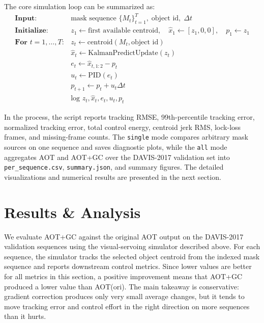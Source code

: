 \documentclass{article}
\begin{document}
The core simulation loop can be summarized as:
\[
\begin{array}{ll}
\textbf{Input:} & \text{mask sequence } \{M_t\}_{t=1}^{T},\; \text{object id},\; \Delta t \\
\textbf{Initialize:} & z_1 \leftarrow \text{first available centroid},\quad
                     \hat{x}_1 \leftarrow [z_1,0,0],\quad p_1 \leftarrow z_1 \\
\textbf{For } t=1,\ldots,T: &
  z_t \leftarrow \text{centroid}(M_t,\text{object id}) \\
& \hat{x}_t \leftarrow \text{KalmanPredictUpdate}(z_t) \\
& e_t \leftarrow \hat{x}_{t,1:2}-p_t \\
& u_t \leftarrow \text{PID}(e_t) \\
& p_{t+1} \leftarrow p_t + u_t\Delta t \\
& \text{log } z_t,\hat{x}_t,e_t,u_t,p_t
\end{array}
\]

In the process, the script reports tracking RMSE, 99th-percentile tracking error, normalized 
tracking error, total control energy, centroid jerk RMS, lock-loss frames, 
and missing-frame counts. The \texttt{single} mode compares arbitrary mask sources on one sequence and 
saves diagnostic plots, while the \texttt{all} mode aggregates AOT and AOT+GC over the DAVIS-2017 
validation set into \texttt{per\_sequence.csv}, \texttt{summary.json}, and summary figures. The detailed 
visualizations and numerical results are presented in the next section.

\section{Results \& Analysis}

We evaluate AOT+GC against the original AOT output on the DAVIS-2017 validation sequences using the
visual-servoing simulator described above. For each sequence, the simulator tracks the selected object
centroid from the indexed mask sequence and reports downstream control metrics. Since lower values are
better for all metrics in this section, a positive improvement means that AOT+GC produced a lower value
than AOT(ori). The main takeaway is conservative: gradient correction produces only very small average
changes, but it tends to move tracking error and control effort in the right direction on more sequences
than it hurts.
\end{document}
